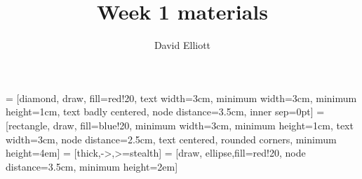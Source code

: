 \documentclass[]{article}
\title{Week 1 materials}
\author{David Elliott}
\begin{document}
\maketitle



{} %

 = [diamond, draw, fill=red!20, 
text width=3cm,  minimum width=3cm, minimum height=1cm, text badly centered, node distance=3.5cm, inner sep=0pt]
 = [rectangle, draw, fill=blue!20,  minimum width=3cm, minimum height=1cm, text width=3cm, node distance=2.5cm, text centered, rounded corners, minimum height=4em]
 = [thick,->,>=stealth]
 = [draw, ellipse,fill=red!20, node distance=3.5cm, minimum height=2em]
\end{document}
